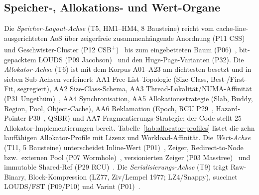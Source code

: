 \subsection{Speicher-, Allokations- und Wert-Organe}\label{ssec:sota-ax-mem}
Die \emph{Speicher-Layout-Achse} (T5, HM1--HM4, 8 Bausteine) reicht vom cache-line-ausgerichteten
AoS über zeigerfreie zusammenhängende Anordnung (P11 CSS)~\cite{rao1999css} und Geschwister-Cluster
(P12 CSB\textsuperscript{+})~\cite{rao2000csb} bis zum eingebetteten Baum
(P06)~\cite{schmeisser2022b2tree}, bit-gepacktem LOUDS (P09 Jacobson)~\cite{jacobson1989louds} und
den Huge-Page-Varianten (P32). Die \emph{Allokator-Achse} (T6) ist mit dem Korpus A01--A23 am
dichtesten besetzt und in sieben Sub-Achsen verfeinert: AA1 Free-List-Topologie (Size-Class,
Best-/First-Fit, segregiert), AA2 Size-Class-Schema, AA3 Thread-Lokalität/NUMA-Affinität (P31
Ungethüm)~\cite{ungethuem2017survey}, AA4 Synchronisation, AA5 Allokationsstrategie (Slab, Buddy,
Region, Pool, Object-Cache), AA6 Reklamation (Epoch, RCU P29~\cite{mckenney2001rcu}, Hazard-Pointer
P30~\cite{michael2004hazard}, QSBR) und AA7 Fragmentierungs-Strategie; der Code stellt 25
Allokator-Implementierungen bereit.
Tabelle~\ref{tab:allocator-profiles} listet die zehn lauffähigen Allokator-Profile mit Lizenz und
Workload-Affinität. Die \emph{Wert-Achse} (T11, 5 Bausteine) unterscheidet Inline-Wert
(P01)~\cite{leis2013art}, Zeiger, Redirect-to-Node bzw.\ externen Pool (P07
Wormhole)~\cite{wu2019wormhole}, versionierten Zeiger (P03 Masstree)~\cite{mao2012masstree} und
immutable Shared-Ref (P29 RCU)~\cite{mckenney2001rcu}. Die \emph{Serialisierungs-Achse} (T9) trägt
Raw-Binary, Block-Kompression (LZ77, Ziv/Lempel 1977; LZ4/Snappy), succinct LOUDS/FST (P09/P10) und
Varint (P01)~\cite{leis2013art}.

